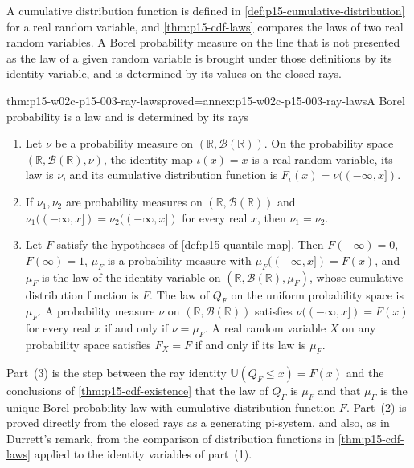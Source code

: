 A cumulative distribution function is defined in
\cref{def:p15-cumulative-distribution} for a real random variable, and
\cref{thm:p15-cdf-laws} compares the laws of two real random variables.
A Borel probability measure on the line that is not presented as the law of
a given random variable is brought under those definitions by its identity
variable, and is determined by its values on the closed rays.

\begin{hbtheorem}{thm:p15-w02c-p15-003-ray-laws}{proved=annex:p15-w02c-p15-003-ray-laws}{A Borel probability is a law and is determined by its rays}
\par\nobreak
\begin{enumerate}
\item Let \(\nu\) be a probability measure on
      \((\mathbb R,\mathcal B(\mathbb R))\). On the probability space
      \((\mathbb R,\mathcal B(\mathbb R),\nu)\), the identity map
      \(\iota(x)=x\) is a real random variable, its law is \(\nu\), and
      its cumulative distribution function is
      \(F_\iota(x)=\nu((-\infty,x])\).
\item If \(\nu_1,\nu_2\) are probability measures on
      \((\mathbb R,\mathcal B(\mathbb R))\) and
      \(\nu_1((-\infty,x])=\nu_2((-\infty,x])\) for every real \(x\),
      then \(\nu_1=\nu_2\).
\item Let \(F\) satisfy the hypotheses of \cref{def:p15-quantile-map}.
      Then \(F(-\infty)=0\), \(F(\infty)=1\), \(\mu_F\) is a
      probability measure with \(\mu_F((-\infty,x])=F(x)\), and
      \(\mu_F\) is the law of the identity variable on
      \((\mathbb R,\mathcal B(\mathbb R),\mu_F)\), whose cumulative
      distribution function is \(F\). The law of \(Q_F\) on the uniform
      probability space is \(\mu_F\). A probability measure \(\nu\) on
      \((\mathbb R,\mathcal B(\mathbb R))\) satisfies
      \(\nu((-\infty,x])=F(x)\) for every real \(x\) if and only if
      \(\nu=\mu_F\). A real random variable \(X\) on any probability
      space satisfies \(F_X=F\) if and only if its law is \(\mu_F\).
\end{enumerate}
\end{hbtheorem}

Part~(3) is the step between the ray identity
\(\mathbb U(Q_F\leq x)=F(x)\) and the conclusions of
\cref{thm:p15-cdf-existence} that the law of \(Q_F\) is \(\mu_F\) and that
\(\mu_F\) is the unique Borel probability law with cumulative distribution
function \(F\). Part~(2) is proved directly from the closed rays as a
generating pi-system, and also, as in Durrett's remark, from the comparison
of distribution functions in \cref{thm:p15-cdf-laws} applied to the identity
variables of part~(1).

